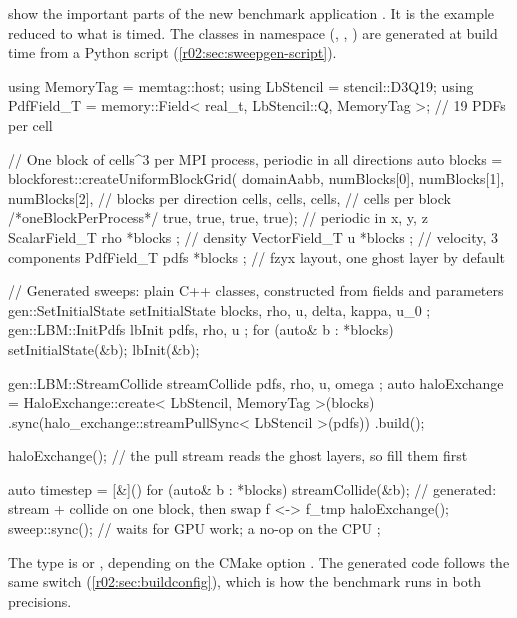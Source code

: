  show the important parts of the new
benchmark application . It is
the  example reduced to what is timed. The classes in namespace
 (, , ) are
generated at build time from a Python script (\cref{r02:sec:sweepgen-script}).

\begin{ccode}[nolol=false,caption={[Setting up blocks, fields and generated sweeps]Setting up blocks, fields and generated sweeps (\texttt{SweepgenLbmCPU.cpp}, abridged).},label=r02:lst:app-setup]
using MemoryTag  = memtag::host;
using LbStencil  = stencil::D3Q19;
using PdfField_T = memory::Field< real_t, LbStencil::Q, MemoryTag >;   // 19 PDFs per cell

//  One block of cells^3 per MPI process, periodic in all directions
auto blocks = blockforest::createUniformBlockGrid(
   domainAabb, numBlocks[0], numBlocks[1], numBlocks[2],   // blocks per direction
   cells, cells, cells,                                    // cells per block
   /*oneBlockPerProcess*/ true, true, true, true);         // periodic in x, y, z
ScalarField_T rho{ *blocks };       // density
VectorField_T u{ *blocks };         // velocity, 3 components
PdfField_T    pdfs{ *blocks };      // fzyx layout, one ghost layer by default

//  Generated sweeps: plain C++ classes, constructed from fields and parameters
gen::SetInitialState setInitialState{ blocks, rho, u, delta, kappa, u_0 };
gen::LBM::InitPdfs   lbInit{ pdfs, rho, u };
for (auto& b : *blocks) { setInitialState(&b); lbInit(&b); }

gen::LBM::StreamCollide streamCollide{ pdfs, rho, u, omega };
auto haloExchange = HaloExchange::create< LbStencil, MemoryTag >(blocks)
                       .sync(halo_exchange::streamPullSync< LbStencil >(pdfs))
                       .build();
\end{ccode}

\begin{ccode}[nolol=false,caption={[The timed time step of the benchmark]The timed time step (\texttt{SweepgenLbmCPU.cpp}).},label=r02:lst:app-timestep]
haloExchange();   // the pull stream reads the ghost layers, so fill them first

auto timestep = [&]() {
   for (auto& b : *blocks)
      streamCollide(&b);   // generated: stream + collide on one block, then swap f <-> f_tmp
   haloExchange();
   sweep::sync();          // waits for GPU work; a no-op on the CPU
};
\end{ccode}

The type  is  or , depending on the CMake option
. The generated code follows the same switch
(\cref{r02:sec:buildconfig}), which is how the benchmark runs in both precisions.
